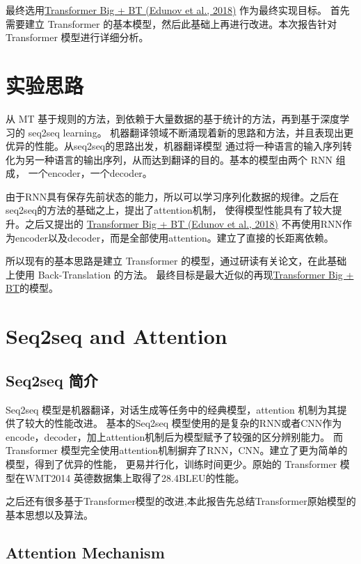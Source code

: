 \documentclass[UTF8,a4paper,10pt]{ctexart}
\begin{document}
  最终选用\href{https://arxiv.org/pdf/1808.09381.pdf}{\color{blue}Transformer Big + BT (Edunov et al., 2018)} 作为最终实现目标。
  首先需要建立 Transformer 的基本模型，然后此基础上再进行改进。本次报告针对 Transformer 模型进行详细分析。


\section{实验思路}

   从 MT 基于规则的方法，到依赖于大量数据的基于统计的方法，再到基于深度学习的 seq2seq learning。
   机器翻译领域不断涌现着新的思路和方法，并且表现出更优异的性能。从seq2seq的思路出发，机器翻译模型
   通过将一种语言的输入序列转化为另一种语言的输出序列，从而达到翻译的目的。基本的模型由两个 RNN 组成，
   一个encoder，一个decoder。
   

   由于RNN具有保存先前状态的能力，所以可以学习序列化数据的规律。之后在seq2seq的方法的基础之上，提出了attention机制，
   使得模型性能具有了较大提升。之后又提出的 \href{https://arxiv.org/pdf/1808.09381.pdf}{\color{blue}Transformer Big + BT (Edunov et al., 2018)} 
   不再使用RNN作为encoder$以及$decoder，而是全部使用attention。建立了直接的长距离依赖。


   所以现有的基本思路是建立 Transformer 的模型，通过研读有关论文，在此基础上使用 Back-Translation 的方法。
   最终目标是最大近似的再现\href{https://arxiv.org/pdf/1808.09381.pdf}{\color{blue}Transformer Big + BT}的模型。

\section{Seq2seq and Attention} 
\subsection{Seq2seq 简介}

   Seq2seq 模型是机器翻译，对话生成等任务中的经典模型，attention 机制为其提供了较大的性能改进。
   基本的Seq2seq 模型使用的是复杂的RNN或者CNN作为encode，decoder，加上attention机制后为模型赋予了较强的区分辨别能力。
   而 Transformer 模型完全使用attention机制摒弃了RNN，CNN。建立了更为简单的模型，得到了优异的性能，
   更易并行化，训练时间更少。原始的 Transformer 模型在WMT2014 英德数据集上取得了28.4BLEU的性能。

   之后还有很多基于Transformer模型的改进,本此报告先总结Transformer原始模型的基本思想以及算法。

\subsection{Attention Mechanism }
\end{document}
